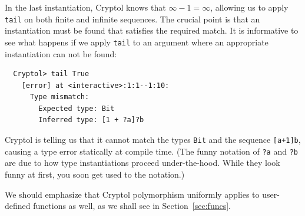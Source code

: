 In the last instantiation, Cryptol knows that $\infty - 1 = \infty$,
allowing us to apply {\tt tail} on both finite and infinite
sequences. The crucial point is that an instantiation must be found
that satisfies the required match.  It is informative to see what
happens if we apply {\tt tail} to an argument where an appropriate
instantiation can not be found:
\begin{Verbatim}
  Cryptol> tail True
    [error] at <interactive>:1:1--1:10:
      Type mismatch:
        Expected type: Bit
        Inferred type: [1 + ?a]?b
\end{Verbatim}
Cryptol is telling us that it cannot match the types {\tt Bit} and the
sequence {\tt [a+1]b}, causing a type error statically at compile
time. (The funny notation of {\tt ?a} and {\tt ?b} are due to how type
instantiations proceed under-the-hood. While they look funny at first,
you soon get used to the notation.)

We should emphasize that Cryptol polymorphism\indPolymorphism
uniformly applies to user-defined functions as well, as we shall see
in Section~\ref{sec:funcs}.

